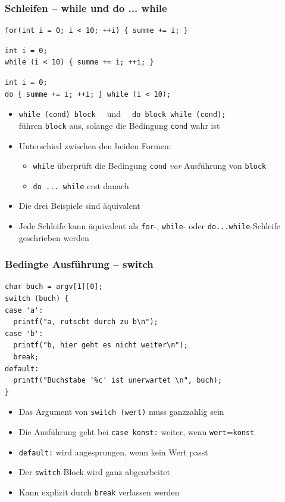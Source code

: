 \documentclass{slides}
\begin{document}
\begin{frame}[fragile]
  \frametitle{Schleifen -- while und do ... while}
\begin{lstlisting}
for(int i = 0; i < 10; ++i) { summe += i; }
\end{lstlisting}
\begin{lstlisting}[emph=while]
int i = 0;
while (i < 10) { summe += i; ++i; }
\end{lstlisting}
\begin{lstlisting}[emph={do,while}]
int i = 0;
do { summe += i; ++i; } while (i < 10);
\end{lstlisting}

  \begin{itemize}
  \item \lstinline!while (cond) block  ! und \lstinline!  do block while (cond);!\\
    führen \lstinline!block! aus, solange die Bedingung \lstinline!cond! wahr ist
  \item Unterschied zwischen den beiden Formen:
    \begin{itemize}
    \item \lstinline!while! überprüft die Bedingung \lstinline!cond! \emph{vor} Ausführung von
      \lstinline!block!
    \item \lstinline!do ... while! erst danach
    \end{itemize}
  \item Die drei Beispiele sind äquivalent
  \item Jede Schleife kann äquivalent als \lstinline!for!-, \lstinline!while!- oder
    \lstinline!do...while!-Schleife geschrieben werden
  \end{itemize}
\end{frame}

\begin{frame}[fragile]
  \frametitle{Bedingte Ausführung -- switch}
\begin{lstlisting}[emph={switch,case,break,default}]
char buch = argv[1][0];
switch (buch) {
case 'a':
  printf("a, rutscht durch zu b\n");
case 'b':
  printf("b, hier geht es nicht weiter\n");
  break;
default:
  printf("Buchstabe '%c' ist unerwartet \n", buch);
}
\end{lstlisting}

  \begin{itemize}
  \item Das Argument von \lstinline!switch (wert)! muss ganzzahlig sein
  \item Die Ausführung geht bei \lstinline!case konst:! weiter,
    wenn \lstinline!wert!=\lstinline!konst!
  \item \lstinline!default:! wird angesprungen, wenn kein Wert passt
  \item Der \lstinline!switch!-Block wird ganz abgearbeitet
  \item Kann explizit durch \lstinline!break! verlassen werden
  \end{itemize}
\end{frame}
\end{document}
